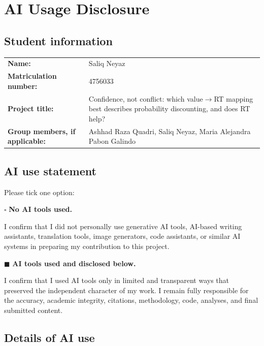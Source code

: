\documentclass[11pt]{article}
\begin{document}
\section*{AI Usage Disclosure}

\subsection*{Student information}

\begin{tabularx}{\textwidth}{>{\bfseries}l X}
Name: & Saliq Neyaz \\[0.6em]
Matriculation number: & 4756033 \\[0.6em]
Project title: & Confidence, not conflict: which value$\to$RT mapping best describes probability discounting, and does RT help? \\[0.6em]
Group members, if applicable: & Ashhad Raza Quadri, Saliq Neyaz, Maria Alejandra Pabon Galindo \\
\end{tabularx}

\bigskip

\subsection*{AI use statement}

Please tick one option:

\medskip

\noindent
$\square$ \textbf{No AI tools used.}

\noindent
I confirm that I did not personally use generative AI tools, AI-based writing
assistants, translation tools, image generators, code assistants, or similar AI
systems in preparing my contribution to this project.

\medskip

\noindent
$\blacksquare$ \textbf{AI tools used and disclosed below.}

\noindent
I confirm that I used AI tools only in limited and transparent ways that preserved
the independent character of my work. I remain fully responsible for the accuracy,
academic integrity, citations, methodology, code, analyses, and final submitted
content.

\bigskip

\subsection*{Details of AI use}
\end{document}

